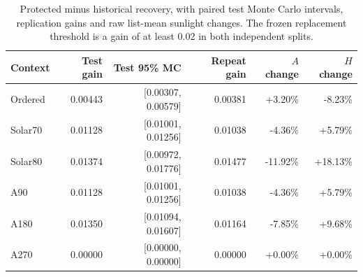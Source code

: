 \begin{table}[tbp]\centering\small\caption{Protected minus historical recovery, with paired test Monte Carlo intervals, replication gains and raw list-mean sunlight changes. The frozen replacement threshold is a gain of at least 0.02 in both independent splits.}\label{tab:gates}
\begin{tabular}{lrrrrr}\toprule
Context & Test gain & Test 95\% MC & Repeat gain & $A$ change & $H$ change\\\midrule
Ordered & 0.00443 & [0.00307, 0.00579] & 0.00381 & +3.20\% & -8.23\%\\
Solar70 & 0.01128 & [0.01001, 0.01256] & 0.01038 & -4.36\% & +5.79\%\\
Solar80 & 0.01374 & [0.00972, 0.01776] & 0.01477 & -11.92\% & +18.13\%\\
A90 & 0.01128 & [0.01001, 0.01256] & 0.01038 & -4.36\% & +5.79\%\\
A180 & 0.01350 & [0.01094, 0.01607] & 0.01164 & -7.85\% & +9.68\%\\
A270 & 0.00000 & [0.00000, 0.00000] & 0.00000 & +0.00\% & +0.00\%\\
\bottomrule\end{tabular}\end{table}
